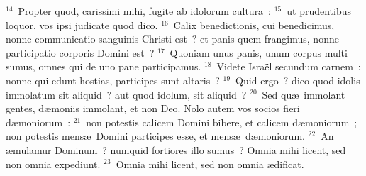 ${}^{14}$~Propter quod, carissimi mihi, fugite ab idolorum cultura~:
${}^{15}$~ut prudentibus loquor, vos ipsi judicate quod dico.
${}^{16}$~Calix benedictionis, cui benedicimus, nonne communicatio sanguinis Christi est~? et panis quem frangimus, nonne participatio corporis Domini est~?
${}^{17}$~Quoniam unus panis, unum corpus multi sumus, omnes qui de uno pane participamus.
${}^{18}$~Videte Isra\"el secundum carnem~: nonne qui edunt hostias, participes sunt altaris~?
${}^{19}$~Quid ergo~? dico quod idolis immolatum sit aliquid~? aut quod idolum, sit aliquid~?
${}^{20}$~Sed qu\ae\ immolant gentes, d\ae moniis immolant, et non Deo. Nolo autem vos socios fieri d\ae moniorum~:
${}^{21}$~non potestis calicem Domini bibere, et calicem d\ae moniorum~; non potestis mens\ae\ Domini participes esse, et mens\ae\ d\ae moniorum.
${}^{22}$~An \ae mulamur Dominum~? numquid fortiores illo sumus~? Omnia mihi licent, sed non omnia expediunt.
${}^{23}$~Omnia mihi licent, sed non omnia \ae dificat.


